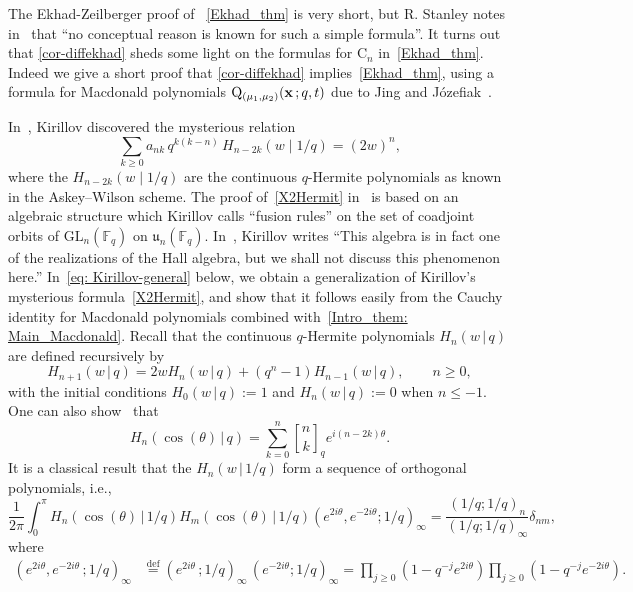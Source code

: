 \documentclass[12pt,a4paper,reqno]{amsart}
\theoremstyle{plain}
\theoremstyle{definition}
\newcommand{\defin}{\overset{\mathrm{def}}{=}}
\newcommand{\FF}{{\mathbb{F}}}
\newcommand{\1}{\mathds{1}}
\newcommand{\GL}{\mathrm{GL}}
\newcommand{\Q}{\mathrm{Q}}
\renewcommand{\u}{\mathfrak{u}}
\newcommand{\x}{{\bf x}}
\begin{document}
The Ekhad-Zeilberger proof of
~\cref{Ekhad_thm}
is very short, but 
R. Stanley notes in~\cite[p. 194]{Stanley} that ``no conceptual reason is known for such a simple formula''. It turns out that 
\cref{cor-diffekhad} sheds some light on the formulas for $\mathrm{C}_n$ in~\cref{Ekhad_thm}.
Indeed 
we give a short proof that \cref{cor-diffekhad} implies~\cref{Ekhad_thm},
using a formula for Macdonald polynomials $\Q_{(\mu_1,\mu_2)}(\x\, ;q,t)$ due to Jing and J\'{o}zefiak~\cite[Eq. (1)]{Jing}.







In~\cite{KirillovX=0}, Kirillov discovered the mysterious relation  
\begin{equation}\label{X2Hermit}
\sum_{k \geq 0} a_{nk} \, q^{k(k-n)} \, H_{n-2k}(w \mid 1/q) = (2w)^n,
\end{equation}
where the \( H_{n-2k}(w \mid 1/q) \) are the continuous $q$-Hermite polynomials as known in the Askey–Wilson scheme. The proof of~\cref{X2Hermit} 
in~\cite{KirillovX=0}
is based on an algebraic structure which Kirillov calls ``fusion rules'' on the set of coadjoint orbits of \( \GL_n(\FF_q) \) on \( \u_n(\FF_q) \). In~\cite{Kirillov}, Kirillov writes ``This algebra is in fact one of the realizations of the Hall algebra, but we shall not discuss this phenomenon here.'' 
In~\cref{eq: Kirillov-general} below, we obtain a generalization of 
Kirillov's mysterious formula~\cref{X2Hermit}, and show that it follows easily from the Cauchy identity for Macdonald polynomials combined with~\cref{Intro_them: Main_Macdonald}.
Recall that the continuous $q$-Hermite polynomials $H_n(w\, |\, q)$ are defined recursively by
$$
H_{n+1}(w\, |\, q)=2wH_n(w\, |\, q)+(q^n-1)H_{n-1}(w\, |\,q), \qquad n\geq 0,
$$
with the initial conditions $H_0(w\,|\,q):=1$ and $H_{n}(w\,|\,q):=0$ when $n\leq -1$. One can also show~\cite[Chapter 13]{Ismail}
 that 
 \begin{equation}
\label{HnvsRogerSzego}
H_n(\cos(\theta)\, |\, q)=\sum_{k=0}^n{n \brack k}_qe^{i(n-2k)\theta}.
\end{equation}
It is  a classical result that the $H_n(w\, |\, 1/q)$ form a sequence of  orthogonal polynomials, i.e.,
\begin{equation}\label{ank:integral}
\frac{1}{2\pi}\int_{0}^\pi H_n(\cos(\theta)\, |\, 1/q)H_m(\cos(\theta)\, |\, 1/q) (e^{2i\theta},e^{-2i\theta};1/q)_{\infty}=\frac{(1/q;1/q)_n}{(1/q;1/q)_\infty}\delta_{nm},
\end{equation}
where 
\begin{align*}
(e^{2i\theta},e^{-2i\theta}\,;1 /q)_{\infty}&\defin\left(e^{2i\theta}\,; 1/q\right)_{\infty}\,\left(e^{-2i\theta}; 1/q\right)_{\infty}
=\prod_{j\geq 0}\left(1-q^{-j}e^{2i\theta}\right)\prod_{j\geq 0}\left(1-q^{-j}e^{-2i\theta}\right).
\end{align*}
\end{document}
